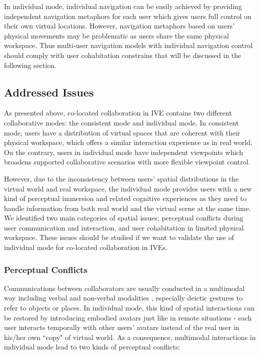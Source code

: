 In individual mode, individual navigation can be easily achieved by providing independent navigation metaphors for each user which gives users full control on their own virtual locations. However, navigation metaphors based on users' physical movements may be problematic as users share the same physical workspace. Thus multi-user navigation models with individual navigation control should comply with user cohabitation constrains that will be discussed in the following section.



\subsection{Addressed Issues}
As presented above, co-located collaboration in IVE contains two different collaborative modes: the consistent mode and individual mode. In consistent mode, users have a distribution of virtual spaces that are coherent with their physical workspace, which offers a similar interaction experience as in real world. On the contrary, users in individual mode have independent viewpoints which broadens supported collaborative scenarios with more flexible viewpoint control.

However, due to the inconsistency between users' spatial distributions in the virtual world and real workspace, the individual mode provides users with a new kind of perceptual immersion and related cognitive experiences as they need to handle information from both real world and the virtual scene at the same time. We identified two main categories of spatial issues: perceptual conflicts during user communication and interaction, and user cohabitation in limited physical workspace. These issues should be studied if we want to validate the use of individual mode for co-located collaboration in IVEs. 


\subsubsection{Perceptual Conflicts}
Communications between collaborators are usually conducted in a multimodal way \citep{Paggio2005Multimodal} including verbal and non-verbal modalities \citep{Ennis2010Seeing, Dodds2011Talk}, especially deictic gestures to refer to objects or places. In individual mode, this kind of spatial interactions can be restored by introducing embodied avatars just like in remote situations - each user interacts temporally with other users' avatars instead of the real user in his/her own ``copy" of virtual world.  As a consequence, multimodal interactions in individual mode lead to two kinds of perceptual conflicts:

